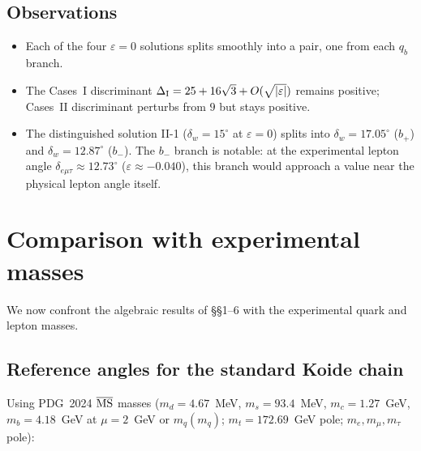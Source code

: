 \documentclass[11pt]{article}
\begin{document}
\subsection{Observations}

\begin{itemize}
  \item Each of the four $\varepsilon=0$ solutions splits smoothly into
    a pair, one from each $q_b$ branch.
  \item The Cases~I discriminant $\Delta_{\rm I} = 25+16\sqrt3 + O(\sqrt{|\varepsilon|})$
    remains positive; Cases~II discriminant perturbs from $9$ but stays positive.
  \item The distinguished solution II-1 ($\delta_w = 15^\circ$ at $\varepsilon=0$)
    splits into $\delta_w = 17.05^\circ$ ($b_+$) and $\delta_w = 12.87^\circ$ ($b_-$).
    The $b_-$ branch is notable: at the experimental lepton angle
    $\delta_{e\mu\tau}\approx 12.73^\circ$
    ($\varepsilon\approx -0.040$), this branch would approach
    a value near the physical lepton angle itself.
\end{itemize}

\section{Comparison with experimental masses}

We now confront the algebraic results of \S\S1--6 with
the experimental quark and lepton masses.

\subsection{Reference angles for the standard Koide chain}

Using PDG~2024 $\overline{\rm MS}$ masses ($m_d = 4.67$~MeV,
$m_s = 93.4$~MeV, $m_c = 1.27$~GeV, $m_b = 4.18$~GeV
at $\mu=2$~GeV or $m_q(m_q)$; $m_t = 172.69$~GeV pole;
$m_e,m_\mu,m_\tau$ pole):
\end{document}
